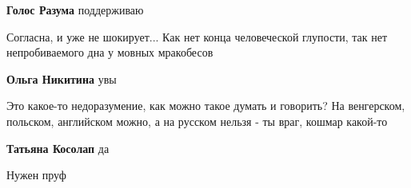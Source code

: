 \begin{itemize}
\begin{itemize}
\textbf{Голос Разума} поддерживаю
\end{itemize}

 
Согласна, и уже не шокирует... Как нет конца человеческой глупости, так нет
непробиваемого дна у мовных мракобесов

\begin{itemize}
 
\textbf{Ольга Никитина} увы
\end{itemize}

 

Это какое-то недоразумение, как можно такое думать и говорить? На венгерском,
польском, английском можно, а на русском нельзя - ты враг, кошмар какой-то

\begin{itemize}
 
\textbf{Татьяна Косолап} да
\end{itemize}

 
Нужен пруф

\begin{itemize}
 

\end{itemize}
\end{itemize}
